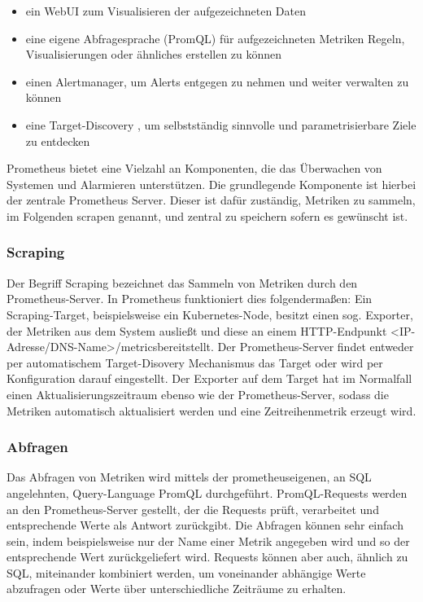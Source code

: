 \documentclass[a4paper,10pt]{scrartcl}
\begin{document}
\begin{itemize} 
\item ein WebUI zum Visualisieren der aufgezeichneten Daten
\item eine eigene Abfragesprache (PromQL) für aufgezeichneten Metriken Regeln, Visualisierungen oder ähnliches erstellen zu können
\item einen Alertmanager, um Alerts entgegen zu nehmen und weiter verwalten zu können
\item eine \glqq Target-Discovery \grqq, um selbstständig sinnvolle und parametrisierbare Ziele zu entdecken

\end{itemize}

Prometheus bietet eine Vielzahl an Komponenten, die das Überwachen von Systemen und Alarmieren unterstützen. Die grundlegende Komponente ist hierbei der zentrale Prometheus Server. Dieser ist dafür zuständig, Metriken zu sammeln, im Folgenden scrapen genannt, und zentral zu speichern sofern es gewünscht ist.

\subsubsection{Scraping}

Der Begriff Scraping bezeichnet das Sammeln von Metriken durch den Prometheus-Server. In Prometheus funktioniert dies folgendermaßen:
Ein Scraping-Target, beispielsweise ein Kubernetes-Node, besitzt einen sog. Exporter, der Metriken aus dem System ausließt und diese an einem HTTP-Endpunkt \glqq<IP-Adresse/DNS-Name>/metrics\grqq bereitstellt. Der Prometheus-Server findet entweder per automatischem Target-Disovery Mechanismus das Target oder wird per Konfiguration darauf eingestellt.
Der Exporter auf dem Target hat im Normalfall einen Aktualisierungszeitraum ebenso wie der Prometheus-Server, sodass die Metriken automatisch aktualisiert werden und eine Zeitreihenmetrik erzeugt wird. 

\subsubsection{Abfragen}

Das Abfragen von Metriken wird mittels der prometheuseigenen, an SQL angelehnten, Query-Language PromQL durchgeführt. PromQL-Requests werden an den Prometheus-Server gestellt, der die Requests prüft, verarbeitet und entsprechende Werte als Antwort zurückgibt. Die Abfragen können sehr einfach sein, indem beispielsweise nur der Name einer Metrik angegeben wird und so der entsprechende Wert zurückgeliefert wird. Requests können aber auch, ähnlich zu SQL, miteinander kombiniert werden, um voneinander abhängige Werte abzufragen oder Werte über unterschiedliche Zeiträume zu erhalten.\\
\end{document}
